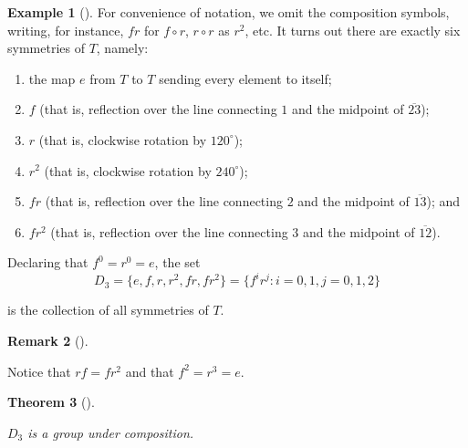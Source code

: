 \documentclass[10pt,]{book}
\theoremstyle{plain}
\newtheorem{theorem}{Theorem}[section]
\theoremstyle{definition}
\theoremstyle{definition}
\newtheorem{remark}[theorem]{Remark}
\theoremstyle{definition}
\newtheorem{example}[theorem]{Example}
\theoremstyle{definition}
\numberwithin{equation}{section}
\begin{document}
\begin{example}[]
      For convenience of notation, we omit the composition symbols, writing, for instance, \(fr\) for \(f\circ r\), \(r\circ r\) as \(r^2\), etc. It turns out there are exactly six symmetries of \(T\), namely:
      \leavevmode%
\begin{enumerate}
\item\hypertarget{li-343}{}
            the map \(e\) from \(T\) to \(T\) sending every element to itself;
\item\hypertarget{li-344}{}
            \(f\) (that is, reflection over the line connecting \(1\) and the midpoint of \(\overline{23}\));
\item\hypertarget{li-345}{}
            \(r\) (that is, clockwise rotation by \(120^{\circ}\));
\item\hypertarget{li-346}{}
            \(r^2\) (that is, clockwise rotation by \(240^{\circ}\));
\item\hypertarget{li-347}{}
            \(fr\) (that is, reflection over the line connecting \(2\) and the midpoint of \(\overline{13}\)); and
\item\hypertarget{li-348}{}
            \(fr^2\) (that is, reflection over the line connecting \(3\) and the midpoint of \(\overline{12}\)).
\end{enumerate}

\par

      Declaring that \(f^0=r^0=e\), the set
\begin{equation*}

        D_3=\{e, f, r, r^2, fr, fr^2\}=\{f^ir^j:i=0,1, j=0,1,2\}
      
\end{equation*}

      is the collection of all symmetries of \(T\).
\end{example}
\begin{remark}[]\label{remark-32}

        Notice that \(rf=fr^2\) and that \(f^2=r^3=e\).
\end{remark}
\begin{theorem}[{}]\label{di3}

          \(D_3\) is a group under composition.
\end{theorem}
\end{document}

